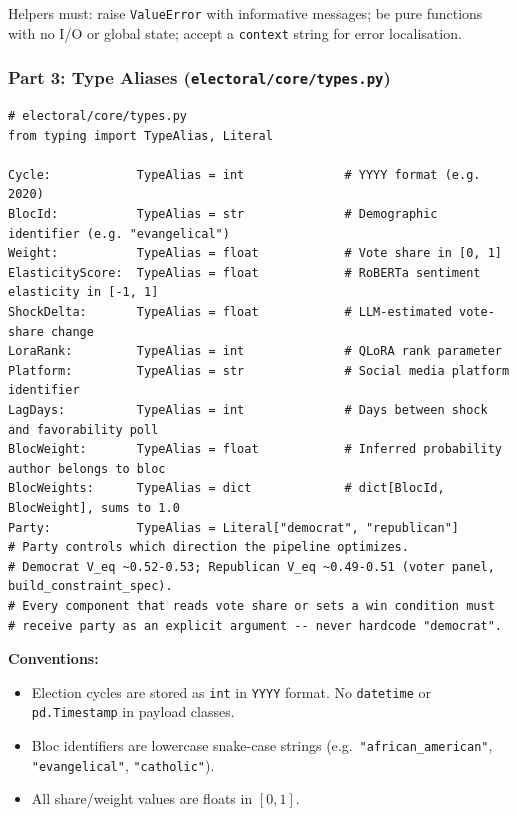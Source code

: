 \documentclass[11pt]{article}
\begin{document}
Helpers must: raise \texttt{ValueError} with informative messages; be pure functions with
no I/O or global state; accept a \texttt{context} string for error localisation.

\subsubsection*{Part 3: Type Aliases (\texttt{electoral/core/types.py})}

\begin{lstlisting}
# electoral/core/types.py
from typing import TypeAlias, Literal

Cycle:            TypeAlias = int              # YYYY format (e.g. 2020)
BlocId:           TypeAlias = str              # Demographic identifier (e.g. "evangelical")
Weight:           TypeAlias = float            # Vote share in [0, 1]
ElasticityScore:  TypeAlias = float            # RoBERTa sentiment elasticity in [-1, 1]
ShockDelta:       TypeAlias = float            # LLM-estimated vote-share change
LoraRank:         TypeAlias = int              # QLoRA rank parameter
Platform:         TypeAlias = str              # Social media platform identifier
LagDays:          TypeAlias = int              # Days between shock and favorability poll
BlocWeight:       TypeAlias = float            # Inferred probability author belongs to bloc
BlocWeights:      TypeAlias = dict             # dict[BlocId, BlocWeight], sums to 1.0
Party:            TypeAlias = Literal["democrat", "republican"]
# Party controls which direction the pipeline optimizes.
# Democrat V_eq ~0.52-0.53; Republican V_eq ~0.49-0.51 (voter panel, build_constraint_spec).
# Every component that reads vote share or sets a win condition must
# receive party as an explicit argument -- never hardcode "democrat".
\end{lstlisting}

\textbf{Conventions:}
\begin{itemize}[leftmargin=1.6em, itemsep=2pt]
  \item Election cycles are stored as \texttt{int} in \texttt{YYYY} format. No
        \texttt{datetime} or \texttt{pd.Timestamp} in payload classes.
  \item Bloc identifiers are lowercase snake-case strings (e.g.\ \texttt{"african\_american"},
        \texttt{"evangelical"}, \texttt{"catholic"}).
  \item All share/weight values are floats in $[0, 1]$.
\end{itemize}
\end{document}

